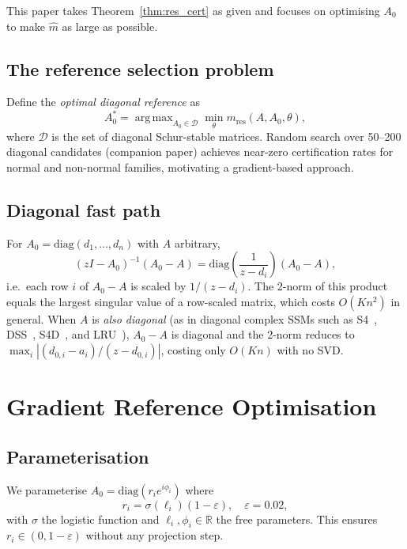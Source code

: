 \documentclass{article}
\theoremstyle{definition}
\newcommand{\R}{\mathbb{R}}
\newcommand{\abs}[1]{\left|#1\right|}
\DeclareMathOperator*{\argmax}{arg\,max}
\begin{document}
\noindent This paper takes Theorem~\ref{thm:res_cert} as given and
focuses on optimising $A_0$ to make $\hat{m}$ as large as possible.

\subsection{The reference selection problem}

Define the \emph{optimal diagonal reference} as
\[
  A_0^* = \argmax_{A_0 \in \mathcal{D}} \min_{\theta} m_{\mathrm{res}}(A, A_0, \theta),
\]
where $\mathcal{D}$ is the set of diagonal Schur-stable matrices.
Random search over 50--200 diagonal candidates (companion paper)
achieves near-zero certification rates for normal and non-normal
families, motivating a gradient-based approach.

\subsection{Diagonal fast path}

For $A_0 = \mathrm{diag}(d_1, \ldots, d_n)$ with $A$ arbitrary,
\[
  (zI - A_0)^{-1}(A_0 - A) = \mathrm{diag}\!\left(\frac{1}{z - d_i}\right)(A_0 - A),
\]
i.e.\ each row $i$ of $A_0 - A$ is scaled by $1/(z - d_i)$.  The
2-norm of this product equals the largest singular value of a
row-scaled matrix, which costs $O(Kn^2)$ in general.  When $A$ is
\emph{also diagonal} (as in diagonal complex SSMs such as
S4~\cite{gu2022s4}, DSS~\cite{gupta2022dss}, S4D~\cite{gu2022s4d},
and LRU~\cite{smith2023simplified}), $A_0 - A$ is
diagonal and the 2-norm reduces to $\max_i \abs{(d_{0,i} -
a_i)/(z - d_{0,i})}$, costing only $O(Kn)$ with no SVD.

\section{Gradient Reference Optimisation}
\label{sec:refopt}

\subsection{Parameterisation}

We parameterise $A_0 = \mathrm{diag}(r_i e^{i\phi_i})$ where
\[
  r_i = \sigma(\ell_i)(1 - \varepsilon), \quad \varepsilon = 0.02,
\]
with $\sigma$ the logistic function and $\ell_i, \phi_i \in \R$ the
free parameters.  This ensures $r_i \in (0, 1 - \varepsilon)$
without any projection step.
\end{document}
